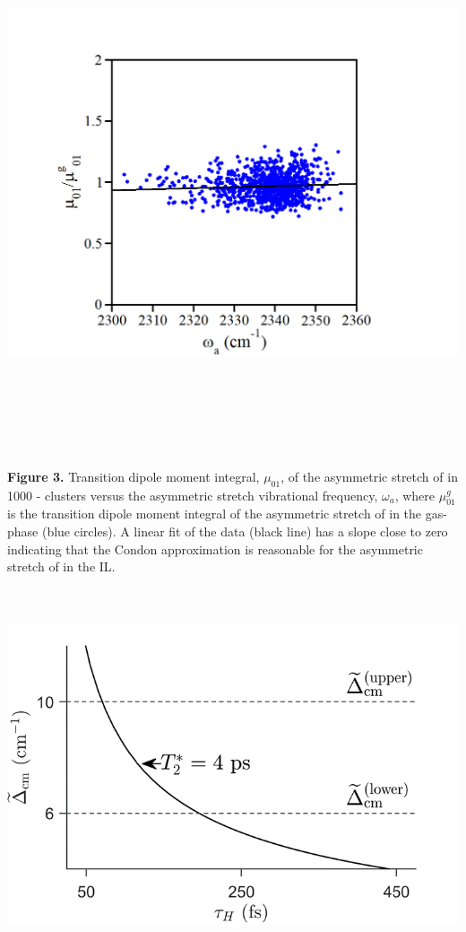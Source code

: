 \documentclass[]{article}
\begin{document}
\includegraphics[width=6.49062in,height=6.25278in]{figure3.png}

\textbf{Figure 3.} Transition dipole moment integral, \(\mu_{01}\), of the asymmetric stretch of  in 1000 -\ce{[C4C1im][PF6]} clusters versus the asymmetric stretch vibrational frequency, \(\omega_{a}\), where \(\mu_{01}^{g}\) is the transition dipole moment integral of the asymmetric stretch of  in the gas-phase (blue circles). A linear fit of the data (black line) has a slope close to zero indicating that the Condon approximation is reasonable for the asymmetric stretch of  in the \ce{[C4C1im][PF6]} IL.

\includegraphics[width=6.45821in,height=4.31466in]{figure4.png}
\end{document}
